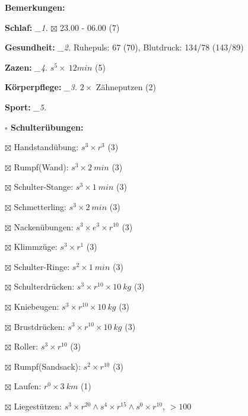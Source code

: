 \documentclass[10pt,a4paper]{article}
\newcommand\prop[1] {{\color {alizarin} {\bf #1}}}             %
\newcommand\mand[1] {{\color {burntorange} {\bf #1}}}          %
\newcommand\topspace{\vskip -15pt \hskip 20pt}
\newcommand\n[1] { {\sl #1.} \hskip 5pt }
\begin{document}
\begin{mdframed}[style=daystyle]
  \begin{labeling}{{\mand {Bemerkungen:}}}
    \setlength\itemsep{-3pt}
  \item[{\mand {Schlaf:}}]        \n{\_1} $\boxtimes$ 23.00 - 06.00 (7)
  \item[{\mand {Gesundheit:}}]    \n{\_2} Ruhepuls: 67 (70), Blutdruck: 134/78 (143/89)
  \item[{\mand {Zazen:}}]         \n{\_4} $s^5 \times\ 12 min$ (5)
  \item[{\mand {Körperpflege:}}]  \n{\_3} $2 \times$ Zähneputzen (2)
  \item[{\mand {Sport:}}]         \n{\_5}
    \topspace
    \begin{minipage}{0.75\textwidth}  
      \begin{labeling}{\prop {$\square$ {Schulterübungen:}}} 
        \setlength\itemsep{-3pt}
      \item[$\boxtimes$ Handstandübung:]  $s^3 \times r^{3}$ (3)
      \item[$\boxtimes$ Rumpf(Wand):]     $s^3 \times 2\ min$ (3)
      \item[$\boxtimes$ Schulter-Stange:] $s^3 \times 1\ min$ (3)
      \item[$\boxtimes$ Schmetterling:]   $s^3 \times 2\ min$ (3)
      \item[$\boxtimes$ Nackenübungen:]   $s^3 \times e^3 \times r^{10}$ (3)
      \item[$\boxtimes$ Klimmzüge:]       $s^3 \times r^1$ (3)
      \item[$\boxtimes$ Schulter-Ringe:]  $s^2 \times 1\ min$ (3)
      \item[$\boxtimes$ Schulterdrücken:] $s^3 \times r^{10} \times 10\ kg$ (3)
      \item[$\boxtimes$ Kniebeugen:]      $s^3 \times r^{10} \times 10\ kg$ (3)
      \item[$\boxtimes$ Brustdrücken:]    $s^3 \times r^{10} \times 10\ kg$ (3)
      \item[$\boxtimes$ Roller:]          $s^3 \times r^{10}$ (3)
      \item[$\boxtimes$ Rumpf(Sandsack):] $s^2 \times r^{10}$ (3)
      \item[$\boxtimes$ Laufen:]          $r^0 \times 3\ km$ (1)
      \item[$\boxtimes$ Liegestützen:]    $s^3 \times r^{20} \land s^4 \times r^{15} \land s^0 \times r^{10}$, $> 100$
      \end{labeling}
    \end{minipage}

\end{labeling}
\end{mdframed}
\end{document}
